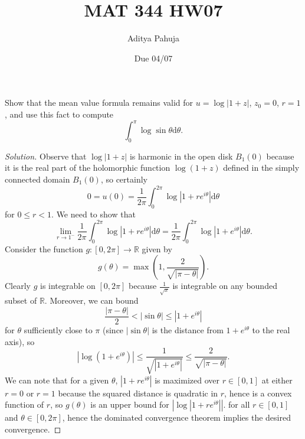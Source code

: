 \documentclass[10pt]{article}
\title{MAT 344 HW07}
\author{\large Aditya Pahuja}
\date{\large Due 04/07}
\newcommand{\dd}{\mathrm{d}}
\providecommand{\RR}{\mathbb R}
\newenvironment{soln}{\begin{proof}[Solution]}{\end{proof}}
\providecommand{\abs}[1]{\left\lvert #1\right\rvert}
\providecommand{\paren}[1]{\left(#1\right)}
\begin{document}
\maketitle

\begin{problem}
    [p.171\#5]
    Show that the mean value formula remains valid for
    $u = \log\abs{1+z}$, $z_0 = 0$, $r = 1$, and use this fact
    to compute
    \begin{equation*}
        \int_0^\pi\log\sin\theta\dd\theta.
    \end{equation*}
\end{problem}

\begin{soln}
    Observe that $\log\abs{1 + z}$ is harmonic in
    the open disk $B_1(0)$ because it is the real part
    of the holomorphic function $\log(1 + z)$
    defined in the simply connected domain $B_1(0)$,
    so certainly
    \begin{equation*}
	0 = u(0) = \frac 1{2\pi} \int_0^{2\pi}
	\log\abs{1 + re^{i\theta}}\dd\theta
    \end{equation*}
    for $0 \le r < 1$. We need to show that
    \begin{equation*}
	\lim_{r\to 1^-} \frac 1{2\pi} \int_0^{2\pi}
	\log\abs{1 + re^{i\theta}}\dd\theta
	= \frac 1{2\pi} \int_0^{2\pi}
	\log\abs{1 + e^{i\theta}}\dd\theta.
    \end{equation*}
    Consider the function $g\colon[0,2\pi]\to\RR$ given by
    \begin{equation*}
	g(\theta) = \max\paren{1, \frac 2{\sqrt{\abs{\pi-\theta}}}}.
    \end{equation*}
    Clearly $g$ is integrable on $[0,2\pi]$
    because $\frac 1{\sqrt x}$ is integrable on any bounded subset of $\RR$.
    Moreover, we can bound
    \begin{equation*}
	\frac{\abs{\pi - \theta}}2 <
	\abs{\sin\theta} \le \abs{1 + e^{i\theta}}
    \end{equation*}
    for $\theta$ sufficiently close to $\pi$
    (since $\abs{\sin\theta}$ is the distance from $1 + e^{i\theta}$
    to the real axis), so
    \begin{equation*}
	\abs{\log(1 + e^{i\theta})}
	\le \frac{1}{\sqrt{\abs{1 + e^{i\theta}}}}
	\le \frac 2{\sqrt{\abs{\pi - \theta}}}.
    \end{equation*}
    We can note that for a given $\theta$,
    $\abs{1 + re^{i\theta}}$ is maximized over $r\in[0,1]$
    at either $r = 0$ or $r = 1$
    because the squared distance is quadratic in $r$,
    hence is a convex function of $r$, so
    $g(\theta)$ is an upper bound for $\abs{\log\abs{1 + re^{i\theta}}}$.
    for all $r\in[0,1]$ and $\theta\in[0,2\pi]$,
    hence the dominated convergence theorem implies
    the desired convergence.


\end{soln}
\end{document}
